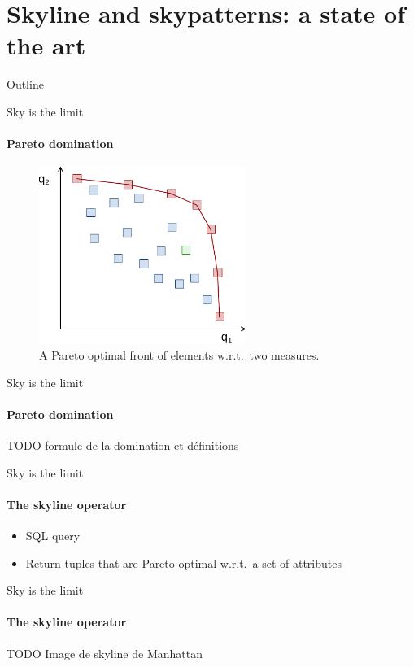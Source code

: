 \documentclass{beamer}
\begin{document}
\section{Skyline and skypatterns: a state of the art}
\begin{frame}{Outline}
  \tableofcontents[currentsection]
\end{frame}

\begin{frame}{Sky is the limit}
  \framesubtitle{Pareto domination}
  \begin{figure}[htp]
    \centering
    \includegraphics[width=0.6\textwidth]{domination.pdf}
    \caption{A Pareto optimal front of elements w.r.t.\ two measures.}
  \end{figure}  
\end{frame}

\begin{frame}{Sky is the limit}
  \framesubtitle{Pareto domination}
  TODO formule de la domination et définitions
\end{frame}

\begin{frame}{Sky is the limit}
  \framesubtitle{The skyline operator}
  \begin{itemize}
  \item SQL query
  \item Return tuples that are Pareto optimal w.r.t.\ a set of attributes
  \end{itemize}
\end{frame}

\begin{frame}{Sky is the limit}
  \framesubtitle{The skyline operator}
  TODO Image de skyline de Manhattan
\end{frame}
\end{document}
